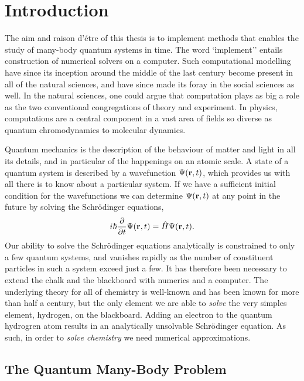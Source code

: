 \chapter{Introduction}

    The aim and raison d'étre of this thesis is to implement methods that enables the 
    study of many-body quantum systems in time. The word `ìmplement'' entails construction 
    of numerical solvers on a computer. Such computational modelling have since its 
    inception around the middle of the last century become present in all of the natural 
    sciences, and have since made its foray in the social sciences as well. In the 
    natural sciences, one could argue that computation plays as big a role as the two 
    conventional congregations of theory and experiment. In physics, computations are 
    a central component in a vast area of fields so diverse as
    quantum chromodynamics\cite{pederiva2018computing,vege2019solving} to 
    molecular dynamics\cite{stende2017constructing,treider2017speeding}.

    Quantum mechanics is the description of the behaviour of matter and light in all 
    its details, and in particular of the happenings on an atomic scale. A state of 
    a quantum system is described by a wavefunction $\Psi(\vb{r}, t)$, which provides 
    us with all there is to know about a particular system. If we have a sufficient 
    initial condition for the wavefunctions we can determine $\Psi(\vb{r}, t)$
    at any point in the future by solving the Schrödinger equations,
    \begin{equation}
        i\hbar \frac{\partial}{\partial t} \Psi(\vb{r}, t) = \hat{H} \Psi(\vb{r}, t).
    \end{equation}
    Our ability to solve the Schrödinger equations analytically is constrained to only 
    a few quantum systems, and vanishes rapidly as the number of constituent particles in 
    such a system exceed just a few. It has therefore been necessary to extend the chalk and 
    the blackboard with numerics and a computer. The underlying theory for all of chemistry 
    is well-known and has been known for more than half a century, but the only element 
    we are able to \emph{solve} the very simples element, hydrogen, on the blackboard.
    Adding an electron to the quantum hydrogren atom results in an analytically 
    unsolvable Schrödinger equation. As such, in order to \emph{solve chemistry} we 
    need numerical approximations.


\section{The Quantum Many-Body Problem}

